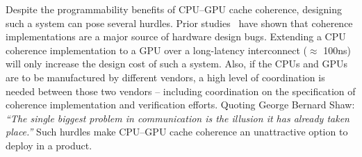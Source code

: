 
Despite the programmability benefits of CPU--GPU cache coherence, designing such
a system can pose several hurdles. Prior
studies~\cite{Hong2012,Vantrease:2011:ACL:2014698.2014902} have shown
that coherence implementations are a major source of hardware design bugs.
Extending a CPU coherence implementation to a GPU over a long-latency
interconnect ($\approx$ 100ns)  will only increase the design cost of such a
system.  Also, if the CPUs and GPUs are to be manufactured by different vendors,
a high level of coordination is needed between those two vendors --
including coordination on the specification of coherence implementation and
verification efforts. Quoting George Bernard Shaw:
\textit{``The single biggest problem in communication is the illusion it has already
taken place.''}
Such hurdles make CPU--GPU cache coherence an unattractive option to
deploy in a product.

